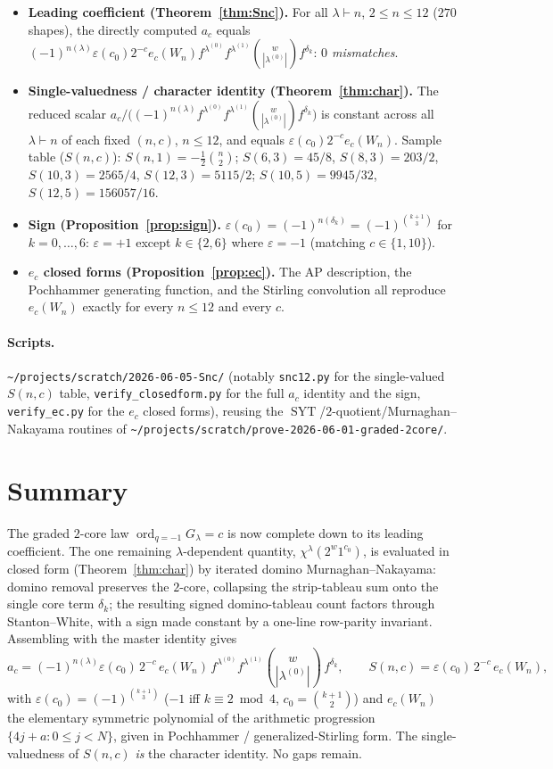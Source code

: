 \documentclass[11pt]{article}
\theoremstyle{definition}
\DeclareMathOperator{\SYT}{SYT}
\DeclareMathOperator{\ord}{ord}
\newcommand{\la}{\lambda}
\begin{document}
\begin{itemize}
\item \textbf{Leading coefficient (Theorem~\ref{thm:Snc}).} For all $\la\vdash n$,
$2\le n\le 12$ ($270$ shapes), the directly computed $a_c$ equals
$(-1)^{n(\la)}\varepsilon(c_0)2^{-c}e_c(W_n)f^{\la^{(0)}}f^{\la^{(1)}}
\binom{w}{|\la^{(0)}|}f^{\delta_k}$: \emph{$0$ mismatches}.
\item \textbf{Single-valuedness / character identity
(Theorem~\ref{thm:char}).} The reduced scalar
$a_c/\big((-1)^{n(\la)}f^{\la^{(0)}}f^{\la^{(1)}}\binom{w}{|\la^{(0)}|}
f^{\delta_k}\big)$ is constant across all $\la\vdash n$ of each fixed $(n,c)$,
$n\le12$, and equals $\varepsilon(c_0)2^{-c}e_c(W_n)$. Sample table
($S(n,c)$): $S(n,1)=-\tfrac12\binom n2$; $S(6,3)=45/8$, $S(8,3)=203/2$,
$S(10,3)=2565/4$, $S(12,3)=5115/2$; $S(10,5)=9945/32$, $S(12,5)=156057/16$.
\item \textbf{Sign (Proposition~\ref{prop:sign}).}
$\varepsilon(c_0)=(-1)^{n(\delta_k)}=(-1)^{\binom{k+1}{3}}$ for $k=0,\dots,6$:
$\varepsilon=+1$ except $k\in\{2,6\}$ where $\varepsilon=-1$ (matching
$c\in\{1,10\}$).
\item \textbf{$e_c$ closed forms (Proposition~\ref{prop:ec}).} The AP
description, the Pochhammer generating function, and the Stirling convolution all
reproduce $e_c(W_n)$ exactly for every $n\le 12$ and every $c$.
\end{itemize}

\paragraph{Scripts.}
\texttt{\~{}/projects/scratch/2026-06-05-Snc/} (notably \texttt{snc12.py} for the
single-valued $S(n,c)$ table, \texttt{verify\_closedform.py} for the full $a_c$
identity and the sign, \texttt{verify\_ec.py} for the $e_c$ closed forms), reusing
the $\SYT$/$2$-quotient/Murnaghan--Nakayama routines of
\texttt{\~{}/projects/scratch/prove-2026-06-01-graded-2core/}.

\section{Summary}

The graded $2$-core law $\ord_{q=-1}G_\la=c$ is now complete down to its leading
coefficient. The one remaining $\la$-dependent quantity, $\chi^\la(2^{w}1^{c_0})$,
is evaluated in closed form (Theorem~\ref{thm:char}) by iterated domino
Murnaghan--Nakayama: domino removal preserves the $2$-core, collapsing the
strip-tableau sum onto the single core term $\delta_k$; the resulting signed
domino-tableau count factors through Stanton--White, with a sign made constant by
a one-line row-parity invariant. Assembling with the master identity gives
\[
  a_c=(-1)^{n(\la)}\varepsilon(c_0)\,2^{-c}\,e_c(W_n)\,
       f^{\la^{(0)}}f^{\la^{(1)}}\binom{w}{|\la^{(0)}|}\,f^{\delta_k},
  \qquad
  S(n,c)=\varepsilon(c_0)\,2^{-c}\,e_c(W_n),
\]
with $\varepsilon(c_0)=(-1)^{\binom{k+1}{3}}$ ($-1$ iff $k\equiv2\bmod4$,
$c_0=\binom{k+1}{2}$) and $e_c(W_n)$ the elementary symmetric polynomial of the
arithmetic progression $\{4j+a:0\le j<N\}$, given in Pochhammer /
generalized-Stirling form. The single-valuedness of $S(n,c)$ \emph{is} the
character identity. No gaps remain.
\end{document}
